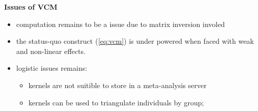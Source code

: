 \documentclass{beamer}
\begin{document}
\begin{frame}
  \textbf{Issues of VCM}
  \begin{itemize}
  \item computation remains to be a issue due to matrix inversion
    involed
  \item the status-quo construct (\ref{eq:vcm}) is under powered when
    faced with weak and non-linear effects.
  \item logistic issues remains:
    \begin{itemize}
    \item kernels are not suitible to store in a meta-analysis server
    \item kernels can be used to triangulate individuals by group;
    \end{itemize}
  \end{itemize}
\end{frame}
\end{document}
